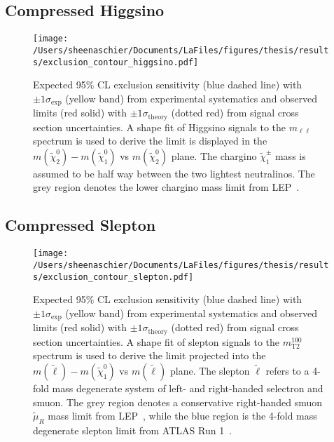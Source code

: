 {\renewcommand{\arraystretch}{1.3}

\FloatBarrier

\subsection{Compressed Higgsino}
 \begin{figure}
 \centering
 \texttt{[image: /Users/sheenaschier/Documents/LaFiles/figures/thesis/results/exclusion\_contour\_higgsino.pdf]}
  \caption{
 Expected 95\% CL exclusion sensitivity (blue dashed line) with $\pm 1 \sigma_\text{exp}$ (yellow band) from experimental systematics
   and observed limits (red solid) with $\pm 1 \sigma_\text{theory}$ (dotted red) from signal cross section uncertainties.
A shape fit of Higgsino signals to the $m_{\ell\ell}$ spectrum is used to derive
 the limit is displayed in the $m(\tilde{\chi}^0_2) - m(\tilde{\chi}^0_1)$ vs $m(\tilde{\chi}^0_2)$ plane.
 The chargino $\tilde{\chi}^\pm_1$ mass is assumed to be half way between the two lightest neutralinos.
  The grey region denotes the lower chargino mass limit from LEP~\cite{LEPlimits}.}
   \label{fig:exclusion_contour_higgsino}
 \end{figure}
 \FloatBarrier
 
 \subsection{Compressed Slepton}
  \begin{figure}
 \centering
 \texttt{[image: /Users/sheenaschier/Documents/LaFiles/figures/thesis/results/exclusion\_contour\_slepton.pdf]}
  \caption{
Expected 95\% CL exclusion sensitivity (blue dashed line) with $\pm 1 \sigma_\text{exp}$ (yellow band) from experimental systematics
and observed limits (red solid) with $\pm 1 \sigma_\text{theory}$ (dotted red) from signal cross section uncertainties.
A shape fit of slepton signals to the $m_\text{T2}^{100}$ spectrum is used to derive
the limit projected into the $m(\tilde{\ell}) - m(\tilde{\chi}^0_1)$ vs $m(\tilde{\ell})$ plane.
The slepton $\tilde{\ell}$ refers to a 4-fold mass degenerate system of left- and right-handed selectron and smuon.
The grey region denotes a conservative right-handed smuon $\tilde{\mu}_R$ mass limit from LEP~\cite{LEPlimits},
while the blue region is the 4-fold mass degenerate slepton limit from ATLAS Run 1~\cite{SUSY-2013-11}.}
   \label{fig:exclusion_contour_slepton}
 \end{figure}
 
}
